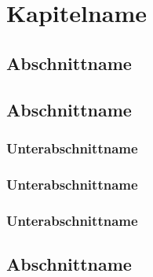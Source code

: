 \chapter{Kapitelname}%
\blindtext%
%
%
\section{Abschnittname}%
\blindtext%
%
%
\section{Abschnittname}%
\blindtext%
%
%
\subsection{Unterabschnittname}%
\blindtext%
%
%
\subsection{Unterabschnittname}%
\blindtext%
%
%
\subsection{Unterabschnittname}%
\blindtext%
%
%
\section{Abschnittname}%
\blindtext%
%
%

